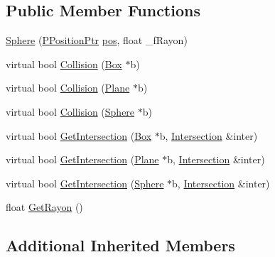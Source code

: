\subsection*{Public Member Functions}
\begin{DoxyCompactItemize}
\item 
\hyperlink{class_agmd_physics_1_1_sphere_a347cc51fce4c9f225e8683e5083e13f2}{Sphere} (\hyperlink{namespace_agmd_physics_a72f849383bbb96be02fec5a53333d7fd}{P\+Position\+Ptr} \hyperlink{_examples_2_planet_2_app_8cpp_aa8a1c0491559faca4ebd0881575ae7f0}{pos}, float \+\_\+f\+Rayon)
\item 
virtual bool \hyperlink{class_agmd_physics_1_1_sphere_a98a64be50e9c009c075661332ed051f8}{Collision} (\hyperlink{class_agmd_physics_1_1_box}{Box} $\ast$b)
\item 
virtual bool \hyperlink{class_agmd_physics_1_1_sphere_a93f7c7e8340e4def8407f4627ee4b68e}{Collision} (\hyperlink{class_agmd_physics_1_1_plane}{Plane} $\ast$b)
\item 
virtual bool \hyperlink{class_agmd_physics_1_1_sphere_a92d86ba4f6c147e02ae63ff99cef5081}{Collision} (\hyperlink{class_agmd_physics_1_1_sphere}{Sphere} $\ast$b)
\item 
virtual bool \hyperlink{class_agmd_physics_1_1_sphere_aedf5fee3b53b08dd33bc1518c4f3577c}{Get\+Intersection} (\hyperlink{class_agmd_physics_1_1_box}{Box} $\ast$b, \hyperlink{struct_agmd_physics_1_1_intersection}{Intersection} \&inter)
\item 
virtual bool \hyperlink{class_agmd_physics_1_1_sphere_a7ac7e2daedc48515f3ce20db9287671f}{Get\+Intersection} (\hyperlink{class_agmd_physics_1_1_plane}{Plane} $\ast$b, \hyperlink{struct_agmd_physics_1_1_intersection}{Intersection} \&inter)
\item 
virtual bool \hyperlink{class_agmd_physics_1_1_sphere_a761e9597fbc0ff74180165a70dc3453f}{Get\+Intersection} (\hyperlink{class_agmd_physics_1_1_sphere}{Sphere} $\ast$b, \hyperlink{struct_agmd_physics_1_1_intersection}{Intersection} \&inter)
\item 
float \hyperlink{class_agmd_physics_1_1_sphere_ad7442773730d6d0074310dd3e9f8d876}{Get\+Rayon} ()
\end{DoxyCompactItemize}
\subsection*{Additional Inherited Members}


